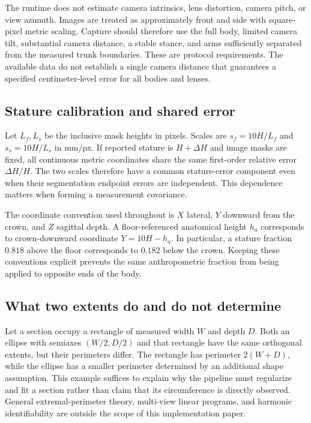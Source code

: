 \documentclass[11pt,a4paper]{article}
\numberwithin{equation}{section}
\begin{document}
The runtime does not estimate camera intrinsics, lens distortion, camera pitch, or view azimuth. Images are treated as approximately front and side with square-pixel metric scaling. Capture should therefore use the full body, limited camera tilt, substantial camera distance, a stable stance, and arms sufficiently separated from the measured trunk boundaries. These are protocol requirements. The available data do not establish a single camera distance that guarantees a specified centimeter-level error for all bodies and lenses.

\subsection{Stature calibration and shared error}
Let $L_f,L_s$ be the inclusive mask heights in pixels. Scales are $s_f=10H/L_f$ and $s_s=10H/L_s$ in mm/px. If reported stature is $H+\Delta H$ and image masks are fixed, all continuous metric coordinates share the same first-order relative error $\Delta H/H$. The two scales therefore have a common stature-error component even when their segmentation endpoint errors are independent. This dependence matters when forming a measurement covariance.

The coordinate convention used throughout is $X$ lateral, $Y$ downward from the crown, and $Z$ sagittal depth. A floor-referenced anatomical height $h_a$ corresponds to crown-downward coordinate $Y=10H-h_a$. In particular, a stature fraction $0.818$ above the floor corresponds to $0.182$ below the crown. Keeping these conventions explicit prevents the same anthropometric fraction from being applied to opposite ends of the body.

\subsection{What two extents do and do not determine}
Let a section occupy a rectangle of measured width $W$ and depth $D$. Both an ellipse with semiaxes $(W/2,D/2)$ and that rectangle have the same orthogonal extents, but their perimeters differ. The rectangle has perimeter $2(W+D)$, while the ellipse has a smaller perimeter determined by an additional shape assumption. This example suffices to explain why the pipeline must regularize and fit a section rather than claim that its circumference is directly observed. General extremal-perimeter theory, multi-view linear programs, and harmonic identifiability are outside the scope of this implementation paper.
\end{document}
